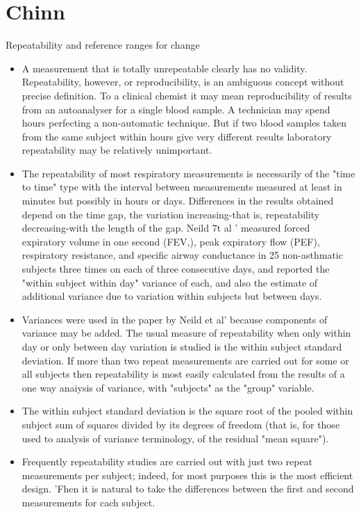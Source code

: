 \documentclass{article}
\begin{document}
\section*{Chinn}
Repeatability and reference ranges for
change
\begin{itemize}
\item A measurement that is totally unrepeatable clearly has no validity. Repeatability,
however, or reproducibility, is an ambiguous concept without precise definition. To a clinical
chemist it may mean reproducibility of results from an autoanalyser for a single blood
sample. A technician may spend hours perfecting a non-automatic technique. But if two
blood samples taken from the same subject within hours give very different results
laboratory repeatability may be relatively unimportant.


\item The repeatability of most respiratory measurements is necessarily of the "time to time" type with the interval between measurements measured at least in minutes but possibly in hours or days. Differences in the results obtained depend on the time gap,
the variation increasing-that is, repeatability decreasing-with the length of the gap. Neild
7t al ' measured forced expiratory volume in one second (FEV,), peak expiratory flow (PEF), respiratory resistance, and specific airway conductance in 25 non-asthmatic subjects
three times on each of three consecutive days, and reported the "within subject within day"
variance of each, and also the estimate of additional variance due to variation within
subjects but between days.

\item Variances were used in the paper by Neild et al' because components of variance may be
added. The usual measure of repeatability when only within day or only between day
variation is studied is the within subject standard
deviation. If more than two repeat
measurements are carried out for some or all
subjects then repeatability is most easily calculated
from the results of a one way anaiysis
of variance, with "subjects" as the "group"
variable. 
\item The within subject standard deviation
is the square root of the pooled within
subject sum of squares divided by its degrees
of freedom (that is, for those used to analysis
of variance terminology, of the residual "mean
square").
\item 
Frequently repeatability studies are carried
out with just two repeat measurements per
subject; indeed, for most purposes this is the
most efficient design. 'Fhen it is natural to take
the differences between the first and second measurements for cach subject. 


\end{itemize}
\end{document}
